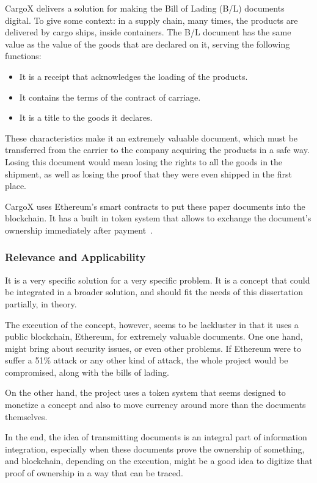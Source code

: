 CargoX delivers a solution for making the Bill of Lading (B/L) documents digital.  To give some context: in a supply chain, many times, the products are delivered by cargo ships, inside containers. The B/L document has the same value as the value of the goods that are declared on it, serving the following functions:
\begin{itemize}
\item It is a receipt that acknowledges the loading of the products.
\item It contains the terms of the contract of carriage.
\item It is a title to the goods it declares.
\end{itemize}
These characteristics make it an extremely valuable document, which must be transferred from the carrier to the company acquiring the products in a safe way. Losing this document would mean losing the rights to all the goods in the shipment, as well as losing the proof that they were even shipped in the first place.

CargoX uses Ethereum's smart contracts to put these paper documents into the blockchain. It has a built in token system that allows to exchange the document's ownership immediately after payment~\cite{CargoX2017}.

\subsubsection{Relevance and Applicability}
It is a very specific solution for a very specific problem. It is a concept that could be integrated in a broader solution, and should fit the needs of this dissertation partially, in theory. 

The execution of the concept, however, seems to be lackluster in that it uses a public blockchain, Ethereum, for extremely valuable documents. 
One one hand, might bring about security issues, or even other problems. If Ethereum were to suffer a 51\% attack or any other kind of attack, the whole project would be compromised, along with the bills of lading. 

On the other hand, the project uses a token system that seems designed to monetize a concept and also to move currency around more than the documents themselves.

In the end, the idea of transmitting documents is an integral part of information integration, especially when these documents prove the ownership of something, and blockchain, depending on the execution, might be a good idea to digitize that proof of ownership in a way that can be traced. 

